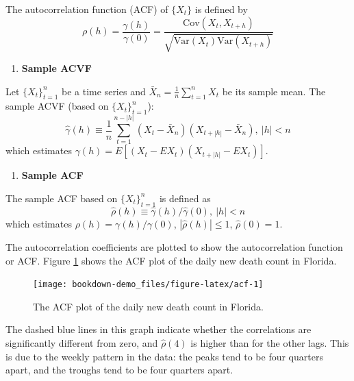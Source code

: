 \documentclass[]{book}
\newenvironment{Shaded}{\begin{snugshade}}{\end{snugshade}}
\newcommand{\KeywordTok}[1]{\textcolor[rgb]{0.13,0.29,0.53}{\textbf{#1}}}
\newcommand{\StringTok}[1]{\textcolor[rgb]{0.31,0.60,0.02}{#1}}
\newcommand{\OperatorTok}[1]{\textcolor[rgb]{0.81,0.36,0.00}{\textbf{#1}}}
\newcommand{\NormalTok}[1]{#1}
\providecommand{\tightlist}{%
  \setlength{\itemsep}{0pt}\setlength{\parskip}{0pt}}
\begin{document}
The autocorrelation function (ACF) of \(\{X_t\}\) is defined by \[
\rho(h)=\frac{\gamma(h)}{\gamma(0)}=\frac{\mathrm{Cov}(X_{t},X_{t+h})}{\sqrt{\mathrm{Var}(X_{t})\mathrm{Var}(X_{t+h})}}
\]

\begin{enumerate}
\def\labelenumi{\arabic{enumi}.}
\setcounter{enumi}{2}
\tightlist
\item
  \textbf{Sample ACVF}
\end{enumerate}

Let \(\{X_t\}_{t=1}^n\) be a time series and
\(\bar{X}_{n}=\frac{1}{n}\sum_{t=1}^{n}X_t\) be its sample mean. The
sample ACVF (based on \(\{X_t\}_{t=1}^n\)): \[
\hat{\gamma}(h)\equiv \frac{1}{n}\sum_{t=1}^{n-|h|} (X_{t}-\bar{X}_{n})(X_{t+|h|}-\bar{X}_{n}), ~|h|<n
\] which estimates \(\gamma(h)=E[(X_t-EX_t)(X_{t+|h|}-EX_t)]\).

\begin{enumerate}
\def\labelenumi{\arabic{enumi}.}
\setcounter{enumi}{3}
\tightlist
\item
  \textbf{Sample ACF}
\end{enumerate}

The sample ACF based on \(\{X_t\}_{t=1}^n\) is defined as \[
\hat{\rho}(h)\equiv \hat{\gamma}(h)/\hat{\gamma}(0), ~|h|<n
\] which estimates \(\rho(h)=\gamma(h)/\gamma(0)\),
\(|\hat{\rho}(h)|\leq 1\), \(\hat{\rho}(0)=1\).

The autocorrelation coefficients are plotted to show the autocorrelation
function or ACF. Figure \ref{fig:acf} shows the ACF plot of the daily
new death count in Florida.

\begin{Shaded}
\end{Shaded}

\begin{figure}

{\centering \texttt{[image: bookdown-demo\_files/figure-latex/acf-1]} 

}

\caption{The ACF plot of the daily new death count in Florida.}\label{fig:acf}
\end{figure}

The dashed blue lines in this graph indicate whether the correlations
are significantly different from zero, and \(\hat{\rho}(4)\) is higher
than for the other lags. This is due to the weekly pattern in the data:
the peaks tend to be four quarters apart, and the troughs tend to be
four quarters apart.
\end{document}
